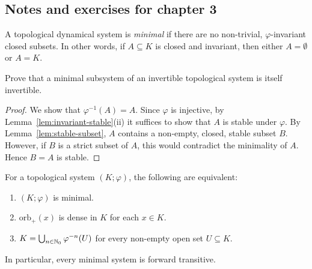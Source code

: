 \subsection{Notes and exercises for chapter 3}

A topological dynamical system is \emph{minimal} if there are no non-trivial, $\varphi$-invariant closed subsets. In other words, if $A \subseteq K$ is closed and invariant, then either $A=\emptyset$ or $A=K$.

\begin{exercise}[Exercise 3.1]
	Prove that a minimal subsystem of an invertible topological system is itself invertible.
\end{exercise}

\begin{proof}
	We show that $\varphi^{-1}(A) = A$. Since $\varphi$ is injective, by Lemma~\ref{lem:invariant-stable}(ii) it suffices to show that $A$ is stable under $\varphi$. By Lemma~\ref{lem:stable-subset}, $A$ contains a non-empty, closed, stable subset $B$. However, if $B$ is a strict subset of $A$, this would contradict the minimality of $A$. Hence $B=A$ is stable.
\end{proof}

\begin{proposition}
	For a topological system $(K;\varphi)$, the following are equivalent:
	\begin{enumerate}[\upshape (i)]
		\item $(K;\varphi)$ is minimal.
		\item $\mathrm{orb}_+(x)$ is dense in $K$ for each $x\in K$.
		\item $K = \bigcup_{n\in\mathbb{N}_0} \varphi^{-n}(U)$ for every non-empty open set $U \subseteq K$.
	\end{enumerate}
	In particular, every minimal system is forward transitive.
\end{proposition}

